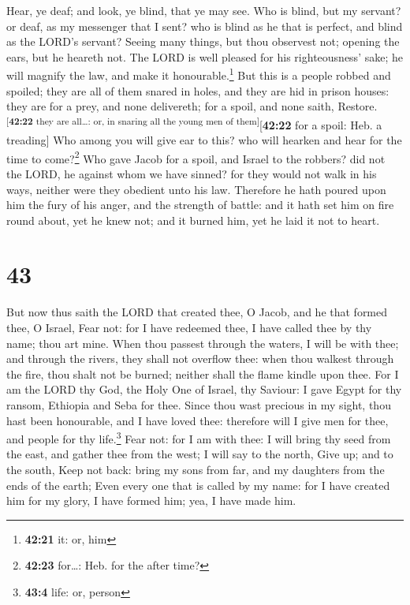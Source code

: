  Hear, ye deaf; and look, ye blind, that ye may see.
 Who is blind, but my servant? or deaf, as my messenger
that I sent? who is blind as he that is perfect, and blind as the LORD's
servant?  Seeing many things, but thou observest not;
opening the ears, but he heareth not.  The LORD is well
pleased for his righteousness' sake; he will magnify the law, and make
it honourable.\footnote{\textbf{42:21} it: or, him}  But
this is a people robbed and spoiled; they are all of them snared in
holes, and they are hid in prison houses: they are for a prey, and none
delivereth; for a spoil, and none saith,
Restore.\textsuperscript{{[}\textbf{42:22} they are all\ldots: or, in
snaring all the young men of them{]}}{[}\textbf{42:22} for a spoil: Heb.
a treading{]}  Who among you will give ear to this? who
will hearken and hear for the time to come?\footnote{\textbf{42:23}
  for\ldots: Heb. for the after time?}  Who gave Jacob
for a spoil, and Israel to the robbers? did not the LORD, he against
whom we have sinned? for they would not walk in his ways, neither were
they obedient unto his law.  Therefore he hath poured
upon him the fury of his anger, and the strength of battle: and it hath
set him on fire round about, yet he knew not; and it burned him, yet he
laid it not to heart.

\hypertarget{section-42}{%
\section{43}\label{section-42}}

 But now thus saith the LORD that created thee, O Jacob,
and he that formed thee, O Israel, Fear not: for I have redeemed thee, I
have called thee by thy name; thou art mine.  When thou
passest through the waters, I will be with thee; and through the rivers,
they shall not overflow thee: when thou walkest through the fire, thou
shalt not be burned; neither shall the flame kindle upon thee.
 For I am the LORD thy God, the Holy One of Israel, thy
Saviour: I gave Egypt for thy ransom, Ethiopia and Seba for thee.
 Since thou wast precious in my sight, thou hast been
honourable, and I have loved thee: therefore will I give men for thee,
and people for thy life.\footnote{\textbf{43:4} life: or, person}
 Fear not: for I am with thee: I will bring thy seed from
the east, and gather thee from the west;  I will say to
the north, Give up; and to the south, Keep not back: bring my sons from
far, and my daughters from the ends of the earth;  Even
every one that is called by my name: for I have created him for my
glory, I have formed him; yea, I have made him.

